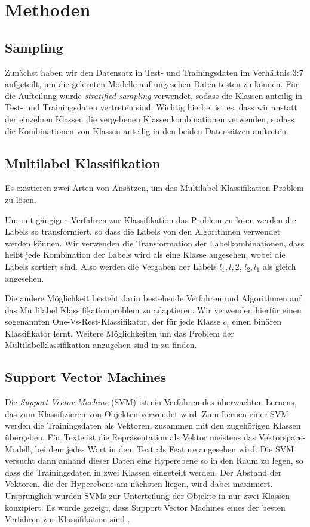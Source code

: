 \section{Methoden}
\subsection{Sampling}

Zunächst haben wir den Datensatz in Test- und Trainingsdaten im Verhältnis 3:7 aufgeteilt, um die gelernten Modelle auf ungesehen Daten testen zu können.
Für die Aufteilung wurde \emph{stratified sampling} verwendet, sodass die Klassen anteilig in Test- und Trainingsdaten vertreten sind.
Wichtig hierbei ist es, dass wir anstatt der einzelnen Klassen die vergebenen Klassenkombinationen verwenden, sodass die Kombinationen von Klassen anteilig in den beiden Datensätzen auftreten.

\subsection{Multilabel Klassifikation}
\label{sub:multilabel_klassifikation}
Es existieren zwei Arten von Ansätzen, um das Multilabel Klassifikation Problem zu lösen.

Um mit gängigen Verfahren zur Klassifikation das Problem zu lösen werden die Labels so transformiert,
so dass die Labels von den Algorithmen verwendet werden können. Wir verwenden die Transformation der Labelkombinationen,
dass heißt jede Kombination der Labels wird als eine Klasse angesehen, wobei die Labels sortiert sind. Also werden die Vergaben der Labels
$l_1,l,2$, $l_2,l_1$ als gleich angesehen.

Die andere Möglichkeit besteht darin bestehende Verfahren und Algorithmen auf das Mutlilabel Klassifikationproblem zu adaptieren.
Wir verwenden hierfür einen sogenannten One-Vs-Rest-Klassifikator, der für jede Klasse $c_i$ einen binären Klassifikator lernt.
Weitere Möglichkeiten um das Problem der Multilabelklassifikation anzugehen sind in \cite{Tsoumakas07multi-labelclassification:} zu finden.

\subsection{Support Vector Machines}
\label{sub:support_vector_machines}
Die \emph{Support Vector Machine} (SVM) ist ein Verfahren des überwachten Lernens, das zum Klassifizieren von Objekten verwendet wird.
Zum Lernen einer SVM werden die Trainingsdaten als Vektoren, zusammen mit den zugehörigen Klassen übergeben.
Für Texte ist die Repräsentation als Vektor meistens das Vektorspace-Modell, bei dem jedes Wort in dem Text als Feature angesehen wird.
Die SVM versucht dann anhand dieser Daten eine Hyperebene so in den Raum zu legen, so dass die Trainingsdaten in zwei Klassen eingeteilt werden.
Der Abstand der Vektoren, die der Hyperebene am nächsten liegen, wird dabei maximiert.
Ursprünglich wurden SVMs zur Unterteilung der Objekte in nur zwei Klassen konzipiert.
Es wurde gezeigt, dass Support Vector Machines eines der besten Verfahren zur Klassifikation sind \cite{Joachims:1998:TCS:645326.649721}.

